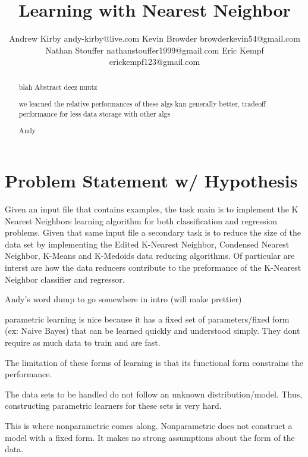 \documentclass[twoside,11pt]{article}
\begin{document}
\title{Learning with Nearest Neighbor}

\author{\name Andrew Kirby \email andy-kirby@live.com \AND
		\name Kevin Browder \email browderkevin54@gmail.com \AND
		\name Nathan Stouffer \email nathanstouffer1999@gmail.com \AND
		\name Eric Kempf \email erickempf123@gmail.com }

\maketitle

\begin{abstract}
	blah Abstract deez nuutz
	
	we learned the relative performances of these algs
	knn generally better, tradeoff performance for less data storage with other algs
	
	Andy 
	
\end{abstract}

\section{Problem Statement w/ Hypothesis}

Given an input file that contains examples, the task main is to implement the K Nearest Neighbors learning algorithm for both classification and regression problems. Given that same input file a secondary task is to reduce the size of the data set by implementing the Edited K-Nearest Neighbor, Condensed Nearest Neighbor, K-Means and K-Medoids data reducing algorithms. Of particular are interst are how the data reducers contribute to the preformance of the K-Nearest Neighbor classifier and regressor.


Andy's word dump to go somewhere in intro (will make prettier) 

parametric learning is nice because it has a fixed set of parameters/fixed form (ex: Naive Bayes) that can be learned quickly and understood simply. They dont require as much data to train and are fast.

The limitation of these forms of learning is that its functional form constrains the performance.

The data sets to be handled do not follow an unknown distribution/model. Thus, constructing parametric learners for these sets is very hard.

This is where nonparametric comes along. Nonparametric does not construct a model with a fixed form. It makes no strong assumptions about the form of the data.
\end{document}
